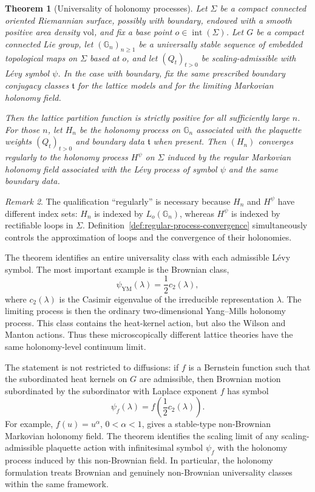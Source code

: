 \documentclass[11pt,a4paper,reqno]{article}
\newtheorem{theorem}{Theorem}[section]
\theoremstyle{definition}
\theoremstyle{remark}
\newtheorem{remark}[theorem]{Remark}
\newcommand\vol{\mathrm{vol}}
\newcommand\Gbb{{\mathbb{G}}}
\begin{document}
\begin{theorem}[Universality of holonomy processes]\label{thm:universality}
Let $\Sigma$ be a compact connected oriented Riemannian surface, possibly with boundary, endowed with a smooth positive area density $\vol$, and fix a base point $o\in\operatorname{int}(\Sigma)$. Let $G$ be a compact connected Lie group, let $(\Gbb_n)_{n\geq1}$ be a universally stable sequence of embedded topological maps on $\Sigma$ based at $o$, and let $(Q_t)_{t>0}$ be scaling-admissible with L\'evy symbol $\psi$. In the case with boundary, fix the same prescribed boundary conjugacy classes $\mathfrak t$ for the lattice models and for the limiting Markovian holonomy field.
\par Then the lattice partition function is strictly positive for all sufficiently large $n$. For those $n$, let $H_n$ be the holonomy process on $\Gbb_n$ associated with the plaquette weights $(Q_t)_{t>0}$ and boundary data $\mathfrak t$ when present. Then $(H_n)$ converges regularly to the holonomy process $H^\psi$ on $\Sigma$ induced by the regular Markovian holonomy field associated with the L\'evy process of symbol $\psi$ and the same boundary data.
\end{theorem}
\begin{remark}
The qualification ``regularly'' is necessary because $H_n$ and $H^\psi$ have different index sets: $H_n$ is indexed by $L_o(\mathbb G_n)$, whereas $H^\psi$ is indexed by rectifiable loops in $\Sigma$. Definition~\ref{def:regular-process-convergence} simultaneously controls the approximation of loops and the convergence of their holonomies.
\end{remark}
The theorem identifies an entire universality class with each admissible L\'evy symbol. The most important example is the Brownian class,
\[
 \psi_{\mathrm{YM}}(\lambda)=\frac12c_2(\lambda),
\]
where $c_2(\lambda)$ is the Casimir eigenvalue of the irreducible representation $\lambda$. The limiting process is then the ordinary two-dimensional Yang--Mills holonomy process. This class contains the heat-kernel action, but also the Wilson and Manton actions. Thus these microscopically different lattice theories have the same holonomy-level continuum limit.

The statement is not restricted to diffusions: if $f$ is a Bernstein function such that the subordinated heat kernels on $G$ are admissible, then Brownian motion subordinated by the subordinator with Laplace exponent $f$ has symbol
\[
 \psi_f(\lambda)=f\!\left(\frac12c_2(\lambda)\right).
\]
For example, $f(u)=u^\alpha$, $0<\alpha<1$, gives a stable-type non-Brownian Markovian holonomy field. The theorem identifies the scaling limit of any scaling-admissible plaquette action with infinitesimal symbol $\psi_f$ with the holonomy process induced by this non-Brownian field. In particular, the holonomy formulation treats Brownian and genuinely non-Brownian universality classes within the same framework.
\end{document}
